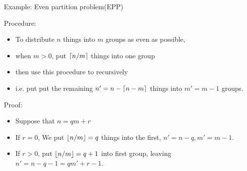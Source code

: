 \begin{frame}{Example: Even partition problem(EPP)}
{\begin{itemize}
    \end{itemize}
}

 {
    Procedure: 
    \begin{itemize}
        \item To distribute $n$ things into 
        $m$ groups as even as possible, 
        \item when $m>0$, put $\left \lceil n/m \right\rceil$ things into one group
        \item then use this procedure to recursively 
        \item i.e. put put the remaining $n'=n-\left \lceil n-m \right\rceil$ things into $m'=m-1$ groups.
    \end{itemize}
    Proof: 
    \begin{itemize}
        \item Suppose that $n=qm+r$
        \item If $r=0$, We put $\left \lfloor n/m \right\rfloor=q$ things into the first, $n'= n-q, m'=m-1$. 
        \item If $r>0$, put $\left \lfloor n/m \right\rfloor=q+1$ into first group, leaving $n'=n-q-1=qm'+r-1$.
    \end{itemize}
}

\end{frame}

